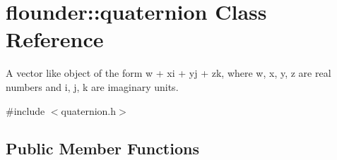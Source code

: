 \hypertarget{classflounder_1_1quaternion}{}\section{flounder\+:\+:quaternion Class Reference}
\label{classflounder_1_1quaternion}


A vector like object of the form w + xi + yj + zk, where w, x, y, z are real numbers and i, j, k are imaginary units.  




{\ttfamily \#include $<$quaternion.\+h$>$}

\subsection*{Public Member Functions}
